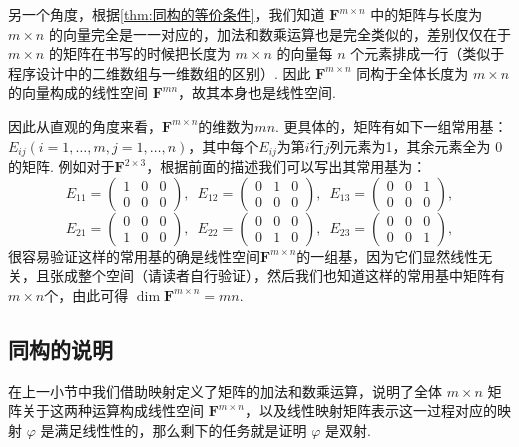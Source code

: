 另一个角度，根据\autoref{thm:同构的等价条件}，我们知道 $\mathbf{F}^{m \times n}$ 中的矩阵与长度为 $m \times n$ 的向量完全是一一对应的，加法和数乘运算也是完全类似的，差别仅仅在于 $m \times n$ 的矩阵在书写的时候把长度为 $m \times n$ 的向量每 $n$ 个元素排成一行（类似于程序设计中的二维数组与一维数组的区别）. 因此 $\mathbf{F}^{m \times n}$ 同构于全体长度为 $m \times n$ 的向量构成的线性空间 $\mathbf{F}^{mn}$，故其本身也是线性空间.

因此从直观的角度来看，$\mathbf{F}^{m\times n}$的维数为$mn$. 更具体的，矩阵有如下一组常用基：$E_{ij}(i=1,\ldots,m,j=1,\ldots,n)$，其中每个$E_{ij}$为第$i$行$j$列元素为1，其余元素全为 $0$ 的矩阵. 例如对于$\mathbf{F}^{2\times 3}$，根据前面的描述我们可以写出其常用基为：
\[E_{11}=\begin{pmatrix}
        1 & 0 & 0 \\
        0 & 0 & 0
    \end{pmatrix},\enspace E_{12}=\begin{pmatrix}
        0 & 1 & 0 \\
        0 & 0 & 0
    \end{pmatrix},\enspace E_{13}=\begin{pmatrix}
        0 & 0 & 1 \\
        0 & 0 & 0
    \end{pmatrix},\]
\[E_{21}=\begin{pmatrix}
        0 & 0 & 0 \\
        1 & 0 & 0
    \end{pmatrix},\enspace E_{22}=\begin{pmatrix}
        0 & 0 & 0 \\
        0 & 1 & 0
    \end{pmatrix},\enspace E_{23}=\begin{pmatrix}
        0 & 0 & 0 \\
        0 & 0 & 1
    \end{pmatrix},\]
很容易验证这样的常用基的确是线性空间$\mathbf{F}^{m\times n}$的一组基，因为它们显然线性无关，且张成整个空间（请读者自行验证），然后我们也知道这样的常用基中矩阵有$m\times n$个，由此可得 $\dim\mathbf{F}^{m\times n} = mn$.

\subsection{同构的说明}

在上一小节中我们借助映射定义了矩阵的加法和数乘运算，说明了全体 $m \times n$ 矩阵关于这两种运算构成线性空间 $\mathbf{F}^{m\times n}$，以及线性映射矩阵表示这一过程对应的映射 $\varphi$ 是满足线性性的，那么剩下的任务就是证明 $\varphi$ 是双射.

